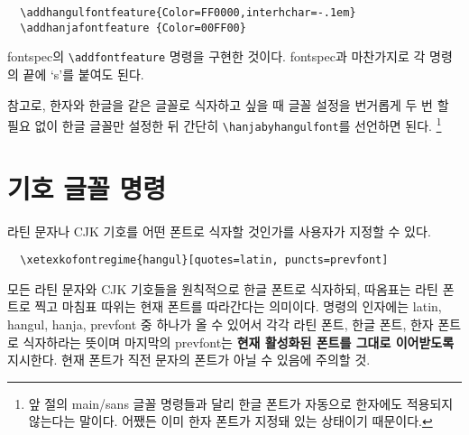 \documentclass[a4paper]{article}
\def\cs#1{\texttt{\textbackslash #1}}
\def\hemph#1{\textsf{\bfseries #1}}
\begin{document}
\begin{verbatim}
  \addhangulfontfeature{Color=FF0000,interhchar=-.1em}
  \addhanjafontfeature {Color=00FF00}
\end{verbatim}
fontspec의 \verb+\addfontfeature+ 명령을 구현한 것이다.
fontspec과 마찬가지로 각 명령의 끝에 `s'를 붙여도 된다.

참고로, 한자와 한글을 같은 글꼴로 식자하고 싶을 때 글꼴 설정을
번거롭게 두 번 할 필요 없이 한글 글꼴만 설정한 뒤 간단히
\cs{hanjabyhangulfont}를 선언하면 된다.%
\footnote{앞 절의 main/sans 글꼴 명령들과 달리 한글 폰트가 자동으로
  한자에도 적용되지 않는다는 말이다. 어쨌든 이미 한자 폰트가 지정돼 있는
  상태이기 때문이다.}


\section{기호 글꼴 명령}\label{sec:symbolfont}
라틴 문자나 CJK 기호를 어떤 폰트로 식자할 것인가를 사용자가 지정할 수 있다.
\begin{verbatim}
  \xetexkofontregime{hangul}[quotes=latin, puncts=prevfont]
\end{verbatim}
모든 라틴 문자와 CJK 기호들을 원칙적으로 한글 폰트로 식자하되,
따옴표는 라틴 폰트로 찍고 마침표 따위는 현재 폰트를 따라간다는 의미이다.
명령의 인자에는 latin, hangul, hanja, prevfont 중 하나가 올 수 있어서
각각 라틴 폰트, 한글 폰트, 한자 폰트로 식자하라는 뜻이며
마지막의 prevfont는 \hemph{현재 활성화된 폰트를 그대로 이어받도록} 지시한다.
현재 폰트가 직전 문자의 폰트가 아닐 수 있음에 주의할 것.
\end{document}
